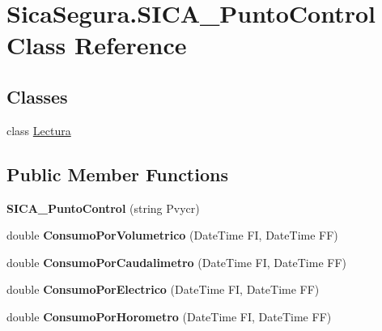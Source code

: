 \hypertarget{class_sica_segura_1_1_s_i_c_a___punto_control}{}\section{Sica\+Segura.\+S\+I\+C\+A\+\_\+\+Punto\+Control Class Reference}
\label{class_sica_segura_1_1_s_i_c_a___punto_control}
\subsection*{Classes}
\begin{DoxyCompactItemize}
\item 
class \hyperlink{class_sica_segura_1_1_s_i_c_a___punto_control_1_1_lectura}{Lectura}
\end{DoxyCompactItemize}
\subsection*{Public Member Functions}
\begin{DoxyCompactItemize}
\item 
{\bfseries S\+I\+C\+A\+\_\+\+Punto\+Control} (string Pvycr)\hypertarget{class_sica_segura_1_1_s_i_c_a___punto_control_a7e613b7627400d4fcd71c0c149a38c79}{}\label{class_sica_segura_1_1_s_i_c_a___punto_control_a7e613b7627400d4fcd71c0c149a38c79}

\item 
double {\bfseries Consumo\+Por\+Volumetrico} (Date\+Time FI, Date\+Time FF)\hypertarget{class_sica_segura_1_1_s_i_c_a___punto_control_a7ccf6a66a7157e7992b145d513b536ce}{}\label{class_sica_segura_1_1_s_i_c_a___punto_control_a7ccf6a66a7157e7992b145d513b536ce}

\item 
double {\bfseries Consumo\+Por\+Caudalimetro} (Date\+Time FI, Date\+Time FF)\hypertarget{class_sica_segura_1_1_s_i_c_a___punto_control_af858df6bcbbd0e608b20591989f232ce}{}\label{class_sica_segura_1_1_s_i_c_a___punto_control_af858df6bcbbd0e608b20591989f232ce}

\item 
double {\bfseries Consumo\+Por\+Electrico} (Date\+Time FI, Date\+Time FF)\hypertarget{class_sica_segura_1_1_s_i_c_a___punto_control_a131e0fea599607032ed64aa23fe6f024}{}\label{class_sica_segura_1_1_s_i_c_a___punto_control_a131e0fea599607032ed64aa23fe6f024}

\item 
double {\bfseries Consumo\+Por\+Horometro} (Date\+Time FI, Date\+Time FF)\hypertarget{class_sica_segura_1_1_s_i_c_a___punto_control_ab7f245c76354534c07715e53c92f9dc0}{}\label{class_sica_segura_1_1_s_i_c_a___punto_control_ab7f245c76354534c07715e53c92f9dc0}

\end{DoxyCompactItemize}
